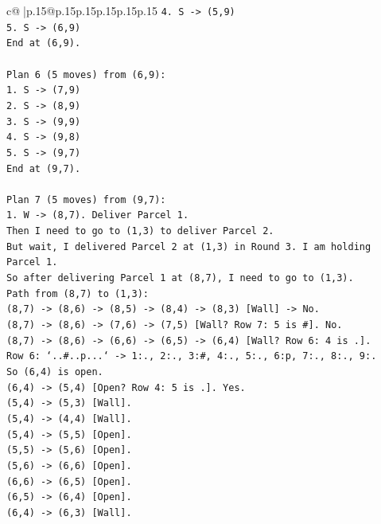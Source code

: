 \documentclass{article}
\begin{document}
{\begin{supertabular}{c@{$\;$}|p{.15\linewidth}@{}p{.15\linewidth}p{.15\linewidth}p{.15\linewidth}p{.15\linewidth}p{.15\linewidth}}
{{{\texttt{4. S {-}> (5,9)} \\
\texttt{5. S {-}> (6,9)} \\
\texttt{End at (6,9).} \\
\\ 
\texttt{Plan 6 (5 moves) from (6,9):} \\
\texttt{1. S {-}> (7,9)} \\
\texttt{2. S {-}> (8,9)} \\
\texttt{3. S {-}> (9,9)} \\
\texttt{4. S {-}> (9,8)} \\
\texttt{5. S {-}> (9,7)} \\
\texttt{End at (9,7).} \\
\\ 
\texttt{Plan 7 (5 moves) from (9,7):} \\
\texttt{1. W {-}> (8,7). Deliver Parcel 1.} \\
\texttt{Then I need to go to (1,3) to deliver Parcel 2.} \\
\texttt{But wait, I delivered Parcel 2 at (1,3) in Round 3. I am holding Parcel 1.} \\
\texttt{So after delivering Parcel 1 at (8,7), I need to go to (1,3).} \\
\texttt{Path from (8,7) to (1,3):} \\
\texttt{(8,7) {-}> (8,6) {-}> (8,5) {-}> (8,4) {-}> (8,3) {[}Wall{]} {-}> No.} \\
\texttt{(8,7) {-}> (8,6) {-}> (7,6) {-}> (7,5) {[}Wall? Row 7: 5 is \#{]}. No.} \\
\texttt{(8,7) {-}> (8,6) {-}> (6,6) {-}> (6,5) {-}> (6,4) {[}Wall? Row 6: 4 is .{]}.} \\
\texttt{Row 6: `..\#..p...` {-}> 1:., 2:., 3:\#, 4:., 5:., 6:p, 7:., 8:., 9:.} \\
\texttt{So (6,4) is open.} \\
\texttt{(6,4) {-}> (5,4) {[}Open? Row 4: 5 is .{]}. Yes.} \\
\texttt{(5,4) {-}> (5,3) {[}Wall{]}.} \\
\texttt{(5,4) {-}> (4,4) {[}Wall{]}.} \\
\texttt{(5,4) {-}> (5,5) {[}Open{]}.} \\
\texttt{(5,5) {-}> (5,6) {[}Open{]}.} \\
\texttt{(5,6) {-}> (6,6) {[}Open{]}.} \\
\texttt{(6,6) {-}> (6,5) {[}Open{]}.} \\
\texttt{(6,5) {-}> (6,4) {[}Open{]}.} \\
\texttt{(6,4) {-}> (6,3) {[}Wall{]}.} \\
}}}
\end{supertabular}}
\end{document}
